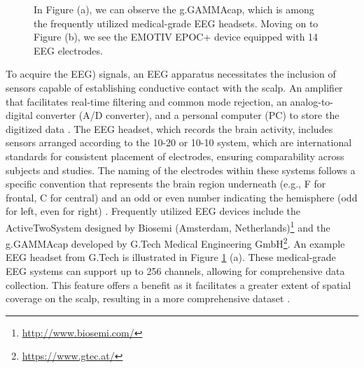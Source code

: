 \begin{figure}%
    \centering
    \qquad
    \caption{In Figure (a), we can observe the g.GAMMAcap, which is among the frequently utilized medical-grade EEG headsets. Moving on to Figure (b), we see the EMOTIV EPOC+ device equipped with 14 EEG electrodes. }
    \label{fig: Headsets}%
\end{figure}
To acquire the EEG) signals, an EEG apparatus necessitates the inclusion of sensors capable of establishing conductive contact with the scalp. An amplifier that facilitates real-time filtering and common mode rejection, an analog-to-digital converter (A/D converter), and a personal computer (PC) to store the digitized data \cite{survey_brain_biometrics}. The EEG headset, which records the brain activity, includes sensors arranged according to the 10-20 or 10-10 system, which are international standards for consistent placement of electrodes, ensuring comparability across subjects and studies. The naming of the electrodes within these systems follows a specific convention that represents the brain region underneath (e.g., F for frontal, C for central) and an odd or even number indicating the hemisphere (odd for left, even for right) \cite{abhang2016introduction}. Frequently utilized EEG devices include the ActiveTwoSystem designed by Biosemi (Amsterdam, Netherlands)\footnote{\url{http://www.biosemi.com/}} and the g.GAMMAcap developed by G.Tech Medical Engineering GmbH\footnote{\url{https://www.gtec.at/}}. An example EEG headset from G.Tech is illustrated in Figure \ref{fig: Headsets} (a). These medical-grade EEG systems can support up to 256 channels, allowing for comprehensive data collection. This feature offers a benefit as it facilitates a greater extent of spatial coverage on the scalp, resulting in a more comprehensive dataset \cite{survey_brain_biometrics}.
\smallskip

